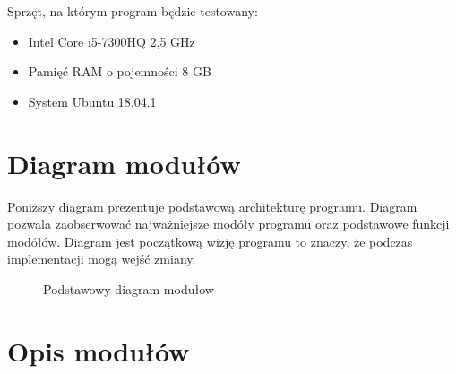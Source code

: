\documentclass[8pt]{article}
\begin{document}
\hspace*{1 cm}Sprzęt, na którym program będzie testowany:
\begin{itemize}
	\item Intel Core i5-7300HQ 2,5 GHz
	\item Pamięć RAM o pojemności 8 GB 
	\item System Ubuntu 18.04.1
\end{itemize}

\section{Diagram modułów}
\hspace*{1 cm}Poniższy diagram prezentuje podstawową architekturę programu. Diagram pozwala zaobserwować najważniejsze modóły programu oraz podstawowe funkcji modółów. Diagram jest początkową wizję  programu to znaczy, że podczas implementacji mogą wejść zmiany.
\begin{figure}[h]
\caption{Podstawowy diagram modułow}
\label{fig:image}
\end{figure}

\section{Opis modułów}
\end{document}
